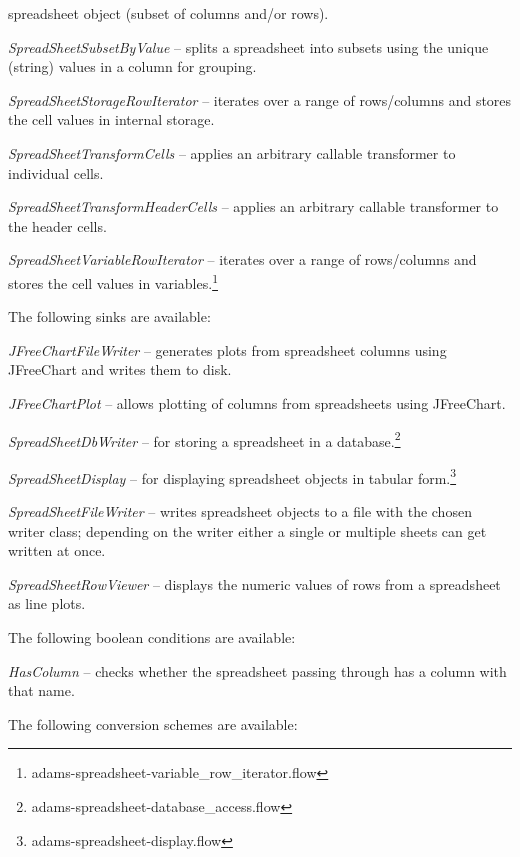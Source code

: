 \documentclass[a4paper]{book}
\begin{document}
\begin{tight_itemize}
	spreadsheet object (subset of columns and/or rows).
	\item \textit{SpreadSheetSubsetByValue} -- splits a spreadsheet into 
	subsets using the unique (string) values in a column for grouping.
	\item \textit{SpreadSheetStorageRowIterator} -- iterates over a range of 
	rows/columns and stores the cell values in internal storage.
	\item \textit{SpreadSheetTransformCells} -- applies an arbitrary callable
	transformer to individual cells.
	\item \textit{SpreadSheetTransformHeaderCells} -- applies an arbitrary callable
	transformer to the header cells.
	\item \textit{SpreadSheetVariableRowIterator} -- iterates over a range of 
	rows/columns and stores the cell values in 
	variables.\footnote{adams-spreadsheet-variable\_row\_iterator.flow}
\end{tight_itemize}
The following sinks are available:
\begin{tight_itemize}
	\item \textit{JFreeChartFileWriter} -- generates plots from spreadsheet
	columns using JFreeChart\cite{jfreechart} and writes them to disk.
	\item \textit{JFreeChartPlot} -- allows plotting of columns from
	spreadsheets using JFreeChart\cite{jfreechart}.
	\item \textit{SpreadSheetDbWriter} -- for storing a spreadsheet in a
	database.\footnote{adams-spreadsheet-database\_access.flow}
	\item \textit{SpreadSheetDisplay} -- for displaying spreadsheet objects
	in tabular form.\footnote{adams-spreadsheet-display.flow}
	\item \textit{SpreadSheetFileWriter} -- writes spreadsheet objects to a file
	with the chosen writer class; depending on the writer either a single or
	multiple sheets can get written at once.
	\item \textit{SpreadSheetRowViewer} -- displays the numeric values of
	rows from a spreadsheet as line plots.
\end{tight_itemize}
The following boolean conditions are available:
\begin{tight_itemize}
	\item \textit{HasColumn} -- checks whether the spreadsheet passing through
	has a column with that name.
\end{tight_itemize}
The following conversion schemes are available:
\end{document}
